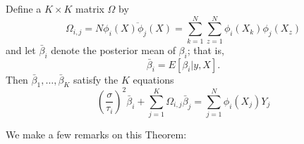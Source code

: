 \begin{thm}\label{thm:regpostmean}
Define a $K\times K$ matrix $\Omega$ by 
\begin{equation*}
\Omega_{i,j} = N\overline{\phi_i(X)\phi_j(X)} = \sum_{k=1}^N\sum_{z=1}^N\phi_i(X_k)\phi_j(X_z) 
\end{equation*}
and let $\bar{\beta}_i$ denote the posterior mean of $\beta_i$; that is, 
\begin{equation*}
\bar{\beta}_i =  E[\beta_i|y,X]. 
\end{equation*}
Then $\bar{\beta}_1,\dots,\bar{\beta}_K$ satisfy the $K$ equations 
\begin{equation}\label{eq:barbeta}
 \left(\frac{\sigma}{\tau_i}\right)^{2}\bar{\beta}_i  +\sum_{j=1}^K\Omega_{i,j}\bar{\beta}_j = \sum_{j=1}^N\phi_i(X_j)Y_j
\end{equation}

\end{thm}
We make a few remarks on this Theorem:
